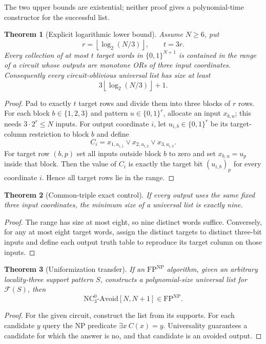 \documentclass[11pt]{article}
\newtheorem{theorem}{Theorem}
\newcommand{\bits}{\{0,1\}}
\begin{document}
The two upper bounds are existential; neither proof gives a polynomial-time
constructor for the successful list.

\begin{theorem}[Explicit logarithmic lower bound]
Assume $N\ge6$, put
\[
 r=\left\lfloor\log_2(N/3)\right\rfloor,
 \qquad t=3r.
\]
Every collection of at most $t$ target words in $\bits^{N+1}$ is contained in
the range of a circuit whose outputs are monotone ORs of three input
coordinates.  Consequently every circuit-oblivious universal list has size at
least
\[
 3\left\lfloor\log_2(N/3)\right\rfloor+1.
\]
\end{theorem}

\begin{proof}
Pad to exactly $t$ target rows and divide them into three blocks of $r$ rows.
For each block $b\in\{1,2,3\}$ and pattern $u\in\bits^r$, allocate an input
$x_{b,u}$; this needs $3\cdot2^r\le N$ inputs.  For output coordinate $i$, let
$u_{i,b}\in\bits^r$ be its target-column restriction to block $b$ and define
\[
 C_i=x_{1,u_{i,1}}\vee x_{2,u_{i,2}}\vee x_{3,u_{i,3}}.
\]
For target row $(b,p)$ set all inputs outside block $b$ to zero and set
$x_{b,u}=u_p$ inside that block.  Then the value of $C_i$ is exactly the target
bit $(u_{i,b})_p$ for every coordinate $i$.  Hence all target rows lie in the
range.
\end{proof}

\begin{theorem}[Common-triple exact control]
If every output uses the same fixed three input coordinates, the minimum size
of a universal list is exactly nine.
\end{theorem}

\begin{proof}
The range has size at most eight, so nine distinct words suffice.  Conversely,
for any at most eight target words, assign the distinct targets to distinct
three-bit inputs and define each output truth table to reproduce its target
column on those inputs.
\end{proof}

\begin{theorem}[Uniformization transfer]
If an $\mathrm{FP}^{\mathrm{NP}}$ algorithm, given an arbitrary locality-three
support pattern $S$, constructs a polynomial-size universal list for
$\mathcal F(S)$, then
\[
 \mathrm{NC}^0_3\text{-Avoid}[N,N+1]\in\mathrm{FP}^{\mathrm{NP}}.
\]
\end{theorem}

\begin{proof}
For the given circuit, construct the list from its supports.  For each candidate
$y$ query the NP predicate $\exists x\ C(x)=y$.  Universality guarantees a
candidate for which the answer is no, and that candidate is an avoided output.
\end{proof}
\end{document}
